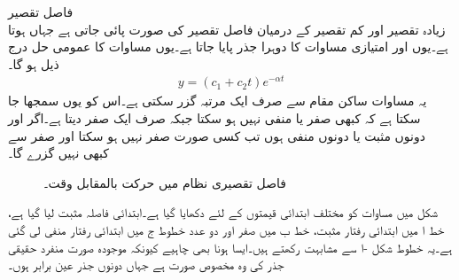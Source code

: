 \quad فاصل تقصیر\\
زیادہ تقصیر اور کم تقصیر کے درمیان فاصل تقصیر کی صورت پائی جاتی ہے جہاں  ہوتا ہے۔یوں  اور امتیازی مساوات کا دوہرا جذر  پایا جاتا ہے۔یوں مساوات  کا عمومی حل درج ذیل ہو گا۔
\begin{align}\label{مساوات_سادہ_دو_درجی_قصری_فاصل_حل_الف}
y=(c_1 +c_2 t)e^{-\alpha t}
\end{align}
یہ مساوات ساکن مقام  سے صرف ایک مرتبہ گزر سکتی ہے۔اس کو یوں سمجھا جا سکتا ہے کہ  کبھی صفر یا منفی نہیں ہو سکتا جبکہ  صرف ایک صفر دیتا ہے۔اگر  اور  دونوں مثبت یا دونوں منفی ہوں تب   کسی صورت  صفر نہیں ہو سکتا اور  صفر سے کبھی نہیں گزرے گا۔ 
\begin{figure}
\centering
{}
\caption{فاصل تقصیری نظام میں حرکت بالمقابل وقت۔}
\label{شکل_سادہ_دو_درجی_فاصل_تقصیری_حرکت_الف}
\end{figure}

شکل  میں مساوات  کو مختلف ابتدائی قیمتوں کے لئے دکھایا گیا ہے۔ابتدائی فاصلہ مثبت لیا گیا ہے، خط ا  میں ابتدائی رفتار مثبت، خط ب میں صفر اور دو عدد خطوط ج میں ابتدائی رفتار منفی لی گئی ہے۔یہ خطوط  شکل -ا سے مشابہت رکھتے ہیں۔ایسا ہونا بھی چاہیے کیونکہ موجودہ صورت منفرد حقیقی جذر کی وہ مخصوص صورت ہے جہاں دونوں جذر عین برابر ہوں۔  


